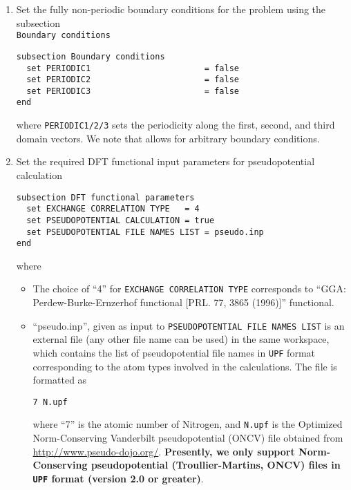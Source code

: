 \begin{enumerate}
\begin{itemize}
{\bf We require Cartesian coordinates for fully non-periodic simulation domain like above while fractional coordinates
are mandatory for periodic and semi-periodic simulation domain.}
\end{itemize}

\item Set the fully non-periodic boundary conditions for the problem using the subsection\\ \verb|Boundary conditions|
\begin{verbatim}	
subsection Boundary conditions
  set PERIODIC1                       = false
  set PERIODIC2                       = false
  set PERIODIC3                       = false
end
\end{verbatim}
where \verb|PERIODIC1/2/3| sets the periodicity along the first, second, and third domain vectors.
We note that \dftfe{} allows for arbitrary boundary conditions.

\item
Set the required DFT functional input parameters for pseudopotential calculation 	
\begin{verbatim}
subsection DFT functional parameters
  set EXCHANGE CORRELATION TYPE   = 4
  set PSEUDOPOTENTIAL CALCULATION = true
  set PSEUDOPOTENTIAL FILE NAMES LIST = pseudo.inp
end
\end{verbatim}
where
\begin{itemize}		
\item The choice of ``4'' for \verb|EXCHANGE CORRELATION TYPE| corresponds to ``GGA: Perdew-Burke-Ernzerhof
functional [PRL. 77, 3865 (1996)]'' functional. 
		
\item ``pseudo.inp'', given as input to \verb|PSEUDOPOTENTIAL FILE NAMES LIST| is an external file (any other file name can be used) in the same workspace, which contains the list of pseudopotential file names in \verb|UPF| format corresponding to the atom types involved in the calculations. The file is formatted as 
\begin{verbatim}
7 N.upf
\end{verbatim}
		where ``7'' is the atomic number of Nitrogen, and \verb|N.upf| is the Optimized Norm-Conserving Vanderbilt pseudopotential (ONCV) file obtained from \url{http://www.pseudo-dojo.org/}. {\bf Presently, we only support Norm-Conserving pseudopotential (Troullier-Martins, ONCV) files in \verb|UPF| format (version 2.0 or greater)}.
\end{itemize}


\end{enumerate}
